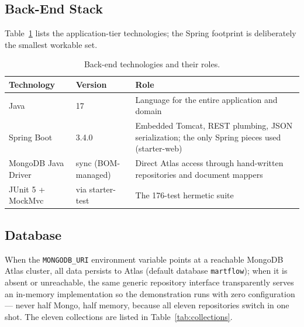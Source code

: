 \documentclass[12pt,a4paper]{report}
\begin{document}
\subsection{Back-End Stack}
Table~\ref{tab:backend} lists the application-tier technologies; the Spring footprint is
deliberately the smallest workable set.

\begin{table}[H]
\centering
\caption{Back-end technologies and their roles.}
\label{tab:backend}
\small
\begin{tabularx}{\textwidth}{l l X}
\toprule
\textbf{Technology} & \textbf{Version} & \textbf{Role} \\
\midrule
Java & 17 & Language for the entire application and domain \\
Spring Boot & 3.4.0 & Embedded Tomcat, REST plumbing, JSON serialization; the only
Spring pieces used (starter-web) \\
MongoDB Java Driver & sync (BOM-managed) & Direct Atlas access through hand-written
repositories and document mappers \\
JUnit 5 + MockMvc & via starter-test & The 176-test hermetic suite \\
\bottomrule
\end{tabularx}
\end{table}

\subsection{Database}
When the \texttt{MONGODB\_URI} environment variable points at a reachable MongoDB Atlas
cluster, all data persists to Atlas (default database \texttt{martflow}); when it is absent
or unreachable, the same generic repository interface transparently serves an in-memory
implementation so the demonstration runs with zero configuration --- never half Mongo,
half memory, because all eleven repositories switch in one shot. The eleven collections
are listed in Table~\ref{tab:collections}.
\end{document}
